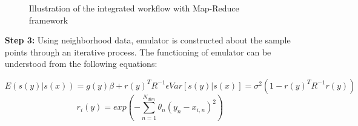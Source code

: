 \documentclass{acm_proc_article-sp}
\begin{document}
\begin{enumerate}
\begin{figure}
\begin{center}
\vspace{-25pt}
\caption{\label{fig2} Illustration of the integrated workflow with Map-Reduce framework}
\end{center}
\end{figure}



\item [ {\bf Step 3:}] Using neighborhood data, emulator is constructed about the sample points through an iterative process. 
The functioning of emulator can be understood from the following equations:

\begin{subequations}\label{mean1}
\begin{equation}
                                E(s(y)|s(x)) = g(y)\beta + {r(y)}^{T}{R}^{-1}\epsilon
\end{equation}
\begin{equation}
                                Var[s(y)|s(x)] = {\sigma}^{2}(1 - {r(y)}^{T}{R}^{-1}r(y))
\end{equation}
\end{subequations}
\begin{equation}
                                r_{i}(y) = exp\left(-\sum_{n=1}^{N_{dim}} \theta_n(y_n-x_{i,n})^{2}\right)
\end{equation}



\end{enumerate}
\end{document}
